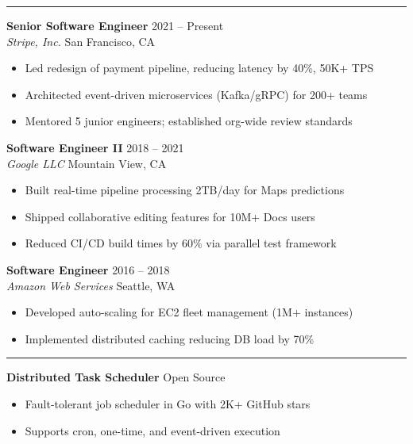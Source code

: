 \documentclass[10pt,letterpaper]{article}
\newcommand{\mainsection}[1]{%
  \vspace{8pt}{\large\bfseries\color{sidebar}#1}\vspace{2pt}\par%
  \noindent\textcolor{accent}{\rule{0.95\linewidth}{1.5pt}}\vspace{4pt}\par%
}
\begin{document}
\begin{minipage}[t]{0.68\textwidth}
\vspace{-8pt}

\mainsection{Experience}

\textbf{Senior Software Engineer} \hfill {\small 2021 -- Present} \\
{\color{accent}\textit{Stripe, Inc.}} \hfill {\small San Francisco, CA}
\begin{itemize}[leftmargin=1em, topsep=2pt, itemsep=1pt, parsep=0pt]
  \item Led redesign of payment pipeline, reducing latency by 40\%, 50K+ TPS
  \item Architected event-driven microservices (Kafka/gRPC) for 200+ teams
  \item Mentored 5 junior engineers; established org-wide review standards
\end{itemize}

\vspace{6pt}
\textbf{Software Engineer II} \hfill {\small 2018 -- 2021} \\
{\color{accent}\textit{Google LLC}} \hfill {\small Mountain View, CA}
\begin{itemize}[leftmargin=1em, topsep=2pt, itemsep=1pt, parsep=0pt]
  \item Built real-time pipeline processing 2TB/day for Maps predictions
  \item Shipped collaborative editing features for 10M+ Docs users
  \item Reduced CI/CD build times by 60\% via parallel test framework
\end{itemize}

\vspace{6pt}
\textbf{Software Engineer} \hfill {\small 2016 -- 2018} \\
{\color{accent}\textit{Amazon Web Services}} \hfill {\small Seattle, WA}
\begin{itemize}[leftmargin=1em, topsep=2pt, itemsep=1pt, parsep=0pt]
  \item Developed auto-scaling for EC2 fleet management (1M+ instances)
  \item Implemented distributed caching reducing DB load by 70\%
\end{itemize}

\mainsection{Projects}

\textbf{Distributed Task Scheduler} \hfill {\small Open Source}
\begin{itemize}[leftmargin=1em, topsep=2pt, itemsep=1pt, parsep=0pt]
  \item Fault-tolerant job scheduler in Go with 2K+ GitHub stars
  \item Supports cron, one-time, and event-driven execution
\end{itemize}

\end{minipage}
\end{document}
